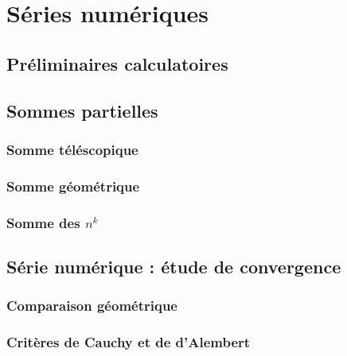 
\chapter{Séries numériques}
\label{chap:1}

\section{Préliminaires calculatoires}


\section{Sommes partielles}

\subsection{Somme téléscopique}

\subsection{Somme géométrique}


\subsection{Somme des $n^k$}


\section{Série numérique : étude de convergence}


\subsection{Comparaison géométrique}

\subsection{Critères de Cauchy et de d'Alembert}

